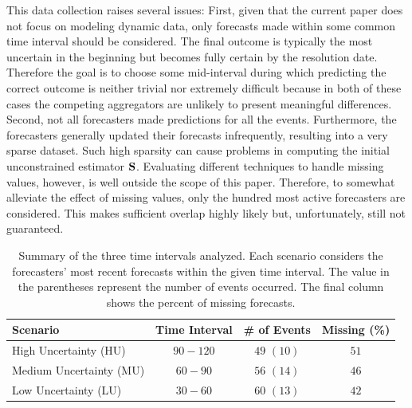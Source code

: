 \documentclass[11pt]{article}
\theoremstyle{definition}
\theoremstyle{definition}
\def\SS{{\bf S}}
\begin{document}

This data collection raises several issues: First, given that the current paper does not focus on modeling dynamic data, only forecasts made within some common time interval should be considered.  The final outcome is typically the most uncertain in the beginning but becomes fully certain by the resolution date. Therefore the goal is to choose some mid-interval during which predicting the correct outcome is neither trivial nor extremely difficult because in both of these cases the competing aggregators are unlikely to present meaningful differences. Second, not all forecasters made predictions for all the events. Furthermore, the forecasters generally updated their forecasts infrequently, resulting into a very sparse dataset. Such high sparsity can cause problems in  computing the initial unconstrained estimator $\SS$. 
Evaluating different techniques to handle missing values, however, is well outside the scope of this paper. Therefore, to somewhat alleviate the effect of missing values, only the hundred most active forecasters are considered. This makes sufficient overlap highly likely but, unfortunately, still not guaranteed. 


\begin{table}[t!]
   \centering
   \caption{Summary of the three time intervals analyzed. Each scenario considers the forecasters' most recent forecasts within the given time interval. The value in the parentheses represent the number of events occurred. The final column shows the percent of missing forecasts. }
   \begin{tabular}{l ccc } %
   \hline\hline
      Scenario      & Time Interval & \# of Events & Missing (\%)  \\\hline
      High Uncertainty (HU)        & $90-120$     & $49$ $(10)$ & $51$\\ 
      Medium Uncertainty (MU)       & $60-90$  &  $56$ $(14)$  & $46$ \\
      Low Uncertainty (LU) &  $30-60$ & $60$ $(13)$ & $42$\\ \hline
   \end{tabular}
   \label{scenarios}
\end{table}
\end{document}
